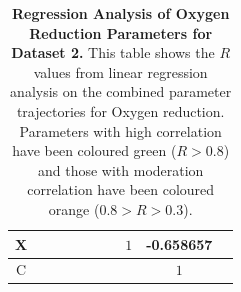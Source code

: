 \begin{table}[p]
{\begin{minipage}{24.4cm}
\begin{tabular}{|c|c|c|c|c|c|c|c|c|c|}
    \hline
    \cellcolor{dark-gray}X & \cellcolor{light-gray} & \cellcolor{light-gray} & \cellcolor{light-gray} & \cellcolor{light-gray} & \cellcolor{light-gray} & \cellcolor{light-gray} & \cellcolor{light-gray}$1$ & \cellcolor{orange}-0.658657 \\
    \hline
    \cellcolor{dark-gray}C & \cellcolor{light-gray} & \cellcolor{light-gray} & \cellcolor{light-gray} & \cellcolor{light-gray} & \cellcolor{light-gray} & \cellcolor{light-gray} & \cellcolor{light-gray} & \cellcolor{light-gray}$1$ \\
    \hline
  \end{tabular}
  \caption[Regression Analysis of Oxygen Reduction Parameters]{{\bf Regression Analysis of Oxygen Reduction Parameters for Dataset 2.} This table shows the $R$ values from linear regression analysis on the combined parameter trajectories for Oxygen reduction. Parameters with high correlation have been coloured green ($R>0.8$) and those with moderation correlation have been coloured orange ($0.8>R>0.3$).
  \label{tab:oxyregress1}}
  \end{minipage}
  }
\end{table}
\afterpage{\clearpage}

